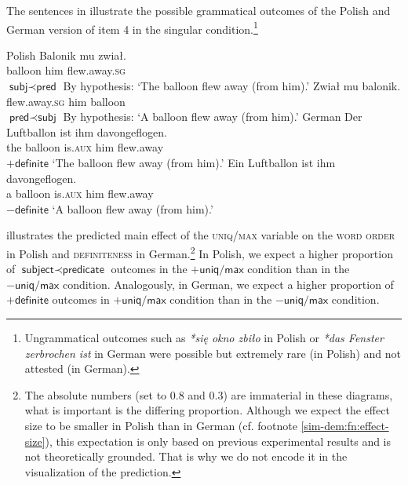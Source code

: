\documentclass[output=paper]{langscibook}
\begin{document}
The sentences in  illustrate the possible grammatical outcomes of the Polish and German version of item 4 in the \textsf{singular} condition.\footnote{Ungrammatical outcomes such as \textit{*się okno zbiło} in Polish or \textit{*das Fenster zerbrochen ist} in German were possible but extremely rare (in Polish) and not attested (in German).}

\ea\label{sim-dem:ex:outcome}\ea Polish
\ea\gll Balonik mu zwiał.\\
balloon him flew.away.\textsc{sg}\\\hfill $\textsf{subj}\prec\textsf{pred}$
\glt By hypothesis: `The balloon flew away (from him).'
\ex\gll Zwiał mu balonik.\\
flew.away.\textsc{sg} him balloon\\\hfill $\textsf{pred}\prec\textsf{subj}$
\glt By hypothesis: `A balloon flew away (from him).'
\z
\ex German
\ea\gll Der Luftballon ist ihm davongeflogen.\\
the balloon is.\textsc{aux} him flew.away\\\hfill$+\textsf{definite}$
\glt `The balloon flew away (from him).'
\ex\gll Ein Luftballon ist ihm davongeflogen.\\
a balloon is.\textsc{aux} him flew.away\\\hfill$-\textsf{definite}$
\glt `A balloon flew away (from him).'
\z
\z\z

\noindent{} illustrates the predicted main effect of the \textsc{uniq/max} variable on the \textsc{word order} in Polish and \textsc{definiteness} in German.\footnote{The absolute numbers (set to $0.8$ and $0.3$) are immaterial in these diagrams, what is important is the differing proportion. Although we expect the effect size to be smaller in Polish than in German (cf. footnote \ref{sim-dem:fn:effect-size}), this expectation is only based on previous experimental results \citep{Simik.Demian2020} and is not theoretically grounded. That is why we do not encode it in the visualization of the prediction.\label{sim-dem:fn:prediction}} In Polish, we expect a higher proportion of $\textsf{subject}\prec\textsf{predicate}$ outcomes in the $+\textsf{uniq/max}$ condition than in the $-\textsf{uniq/max}$ condition. Analogously, in German, we expect a higher proportion of $+\textsf{definite}$ outcomes in $+\textsf{uniq/max}$ condition than in the $-\textsf{uniq/max}$ condition.
\end{document}
